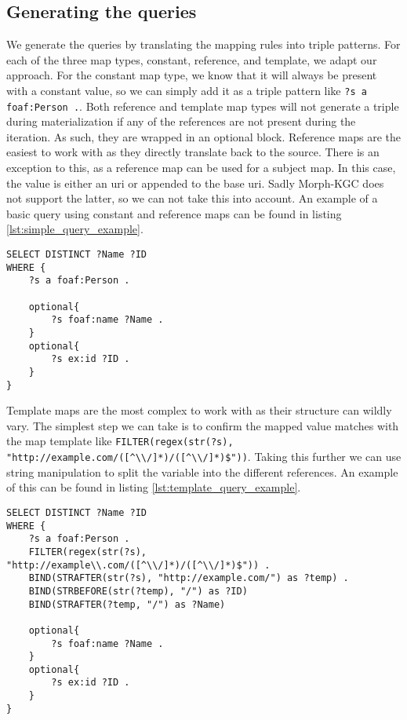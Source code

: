\subsection{Generating the queries}
\label{subsection:generating_queries}
We generate the queries by translating the mapping rules into triple patterns. 
For each of the three map types, constant, reference, and template, we adapt our approach. 
For the constant map type, we know that it will always be present with a constant value, so we can simply add it as a triple pattern like \texttt{?s a foaf:Person .}. 
Both reference and template map types will not generate a triple during materialization if any of the references are not present during the iteration. As such, they are wrapped in an optional block. 
Reference maps are the easiest to work with as they directly translate back to the source. There is an exception to this, as a reference map can be used for a subject map. In this case, the value is either an \acrshort{uri} or appended to the base \acrshort{uri}. Sadly Morph-KGC does not support the latter, so we can not take this into account. An example of a basic query using constant and reference maps can be found in listing \ref{lst:simple_query_example}.

\begin{lstlisting}[caption={Simple query example}, label={lst:simple_query_example}, captionpos=b]
SELECT DISTINCT ?Name ?ID
WHERE {
    ?s a foaf:Person .

    optional{
        ?s foaf:name ?Name .
    }
    optional{
        ?s ex:id ?ID .
    }
}
\end{lstlisting}    

Template maps are the most complex to work with as their structure can wildly vary. The simplest step we can take is to confirm the mapped value matches with the map template like
\texttt{FILTER(regex(str(?s), "http://example.com/([\textasciicircum\textbackslash\textbackslash/]*)/([\textasciicircum\textbackslash\textbackslash/]*)\$"))}. Taking this further we can use string manipulation to split the variable into the different references. An example of this can be found in listing \ref{lst:template_query_example}.

\begin{lstlisting}[caption={Template query example}, label={lst:template_query_example}, captionpos=b]
SELECT DISTINCT ?Name ?ID
WHERE {
    ?s a foaf:Person .
    FILTER(regex(str(?s), "http://example\\.com/([^\\/]*)/([^\\/]*)$")) .
    BIND(STRAFTER(str(?s), "http://example.com/") as ?temp) .
    BIND(STRBEFORE(str(?temp), "/") as ?ID)
    BIND(STRAFTER(?temp, "/") as ?Name)

    optional{
        ?s foaf:name ?Name .
    }
    optional{
        ?s ex:id ?ID .
    }
}
\end{lstlisting}

